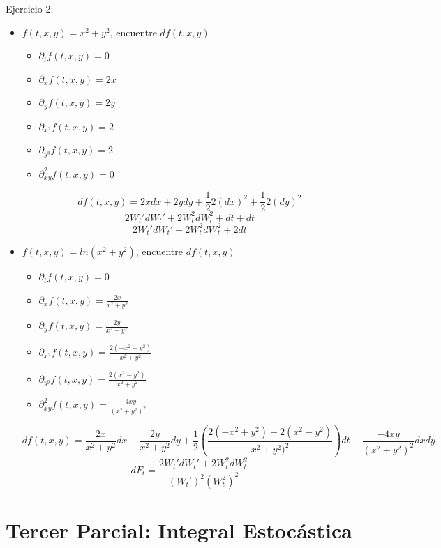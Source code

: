 \documentclass[11pt,fleqn]{book} %
\numberwithin{equation}{section} %
\numberwithin{figure}{section} %
\numberwithin{table}{section} %
\begin{document}
Ejercicio 2:
\begin{itemize}
    \item $f(t,x,y) = x^{2} + y^{2} $, encuentre $df(t,x,y)$
    \begin{itemize}
        \item $\partial_{t} f(t,x,y)= 0 $
        \item $\partial_{x} f(t,x,y)= 2x $
        \item $\partial_{y} f(t,x,y)= 2y $
        \item $\partial_{x^{2}} f(t,x,y)= 2 $
        \item $\partial_{y^{y}} f(t,x,y)= 2 $
        \item $\partial_{xy}^{2} f(t,x,y)= 0 $
    \end{itemize}
    $$ df(t,x,y) = 2xdx + 2ydy + \frac{1}{2}2(dx)^{2} + \frac{1}{2}2(dy)^{2}  $$
    $$  2W_{t}'dW_{t}' + 2W_{t}^{2}dW_{t}^{2} + dt + dt  $$  
    $$  2W_{t}'dW_{t}' + 2W_{t}^{2}dW_{t}^{2} + 2dt  $$
    \item $f(t,x,y) = ln(x^{2} + y^{2}) $, encuentre $df(t,x,y)$
    \begin{itemize}
        \item $\partial_{t} f(t,x,y)= 0 $
        \item $\partial_{x} f(t,x,y)= \frac{2x}{x^{2} + y^{2}} $
        \item $\partial_{y} f(t,x,y)= \frac{2y}{x^{2} + y^{2}}  $
        \item $\partial_{x^{2}} f(t,x,y)= \frac{2(-x^{2} + y^{2})}{x^{2} + y^{2}} $
        \item $\partial_{y^{y}} f(t,x,y)= \frac{2(x^{2} - y^{2})}{x^{2} + y^{2}} $
        \item $\partial_{xy}^{2} f(t,x,y)= \frac{-4xy}{(x^{2} + y^{2})^{2}} $
    \end{itemize}
    $$ df(t,x,y) = \frac{2x}{x^{2} + y^{2}} dx + \frac{2y}{x^{2} + y^{2}} dy + \frac{1}{2} (\frac{2(-x^{2} + y^{2}) + 2(x^{2} - y^{2})}{x^{2} + y^{2})^{2}}) dt - \frac{-4xy}{(x^{2} + y^{2})^{2}} dxdy $$
    $$  dF_{t} = \frac{2W_{t}'dW_{t}' + 2W_{t}^{2}dW_{t}^{2}}{(W_{t}')^{2}(W_{t}^{2})^{2}}    $$
\end{itemize}

\chapter{Tercer Parcial: Integral Estocástica}
\end{document}
